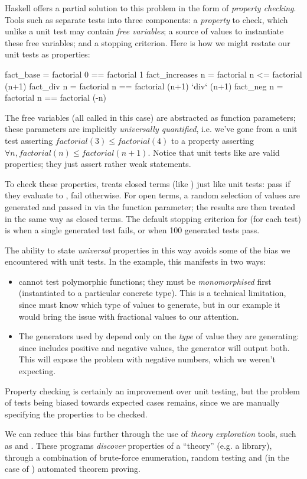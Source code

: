 Haskell offers a partial solution to this problem in the form of \emph{property
  checking}. Tools such as \qcheck{} separate tests into three components: a
\emph{property} to check, which unlike a unit test may contain \emph{free
  variables}; a source of values to instantiate these free variables; and a
stopping criterion. Here is how we might restate our unit tests as properties:

\begin{haskell}
fact_base        = factorial 0 == factorial 1
fact_increases n = factorial n <= factorial (n+1)
fact_div       n = factorial n == factorial (n+1) `div` (n+1)
fact_neg       n = factorial n == factorial (-n)
\end{haskell}

The free variables (all called  in this case) are abstracted as function
parameters; these parameters are implicitly \emph{universally quantified},
i.e. we've gone from a unit test asserting $factorial(3) \leq factorial(4)$ to a
property asserting $\forall n, factorial(n) \leq factorial(n+1)$. Notice that
unit tests like  are valid properties; they just assert rather
weak statements.

To check these properties, \qcheck{} treats closed terms (like )
just like unit tests: pass if they evaluate to , fail otherwise. For
open terms, a random selection of values are generated and passed in via the
function parameter; the results are then treated in the same way as closed
terms. The default stopping criterion for \qcheck{} (for each test) is when a
single generated test fails, or when 100 generated tests pass.

The ability to state \emph{universal} properties in this way avoids some of the
bias we encountered with unit tests. In the  example, this
manifests in two ways:

\begin{itemize}
\item \qcheck{} cannot test polymorphic functions; they must be
  \emph{monomorphised} first (instantiated to a particular concrete type). This
  is a technical limitation, since \qcheck{} must know which type of values to
  generate, but in our example it would bring the issue with fractional values
  to our attention.

\item The generators used by \qcheck{} depend only on the \emph{type} of value
  they are generating: since  includes positive and negative values, the
   generator will output both. This will expose the problem with
  negative numbers, which we weren't expecting.
\end{itemize}

Property checking is certainly an improvement over unit testing, but the problem
of tests being biased towards expected cases remains, since we are manually
specifying the properties to be checked.

We can reduce this bias further through the use of \emph{theory exploration}
tools, such as \qspec{} and \hspec{}. These programs \emph{discover} properties
of a ``theory'' (e.g. a library), through a combination of brute-force
enumeration, random testing and (in the case of \hspec{}) automated theorem
proving.
